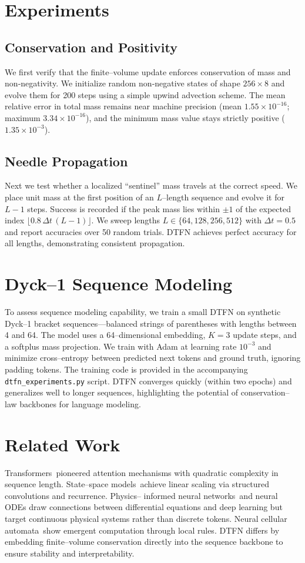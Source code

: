 \documentclass[10pt]{article}
\begin{document}
\section{Experiments}
\subsection{Conservation and Positivity}
We first verify that the finite–volume update enforces conservation of mass
and non‑negativity. We initialize random non‑negative states of shape
$256\times8$ and evolve them for 200 steps using a simple upwind advection
scheme. The mean relative error in total mass remains near machine precision
(mean $1.55\times 10^{-16}$; maximum $3.34\times 10^{-16}$), and the minimum
mass value stays strictly positive ($1.35\times 10^{-3}$).

\subsection{Needle Propagation}
Next we test whether a localized ``sentinel'' mass travels at the correct
speed. We place unit mass at the first position of an $L$--length sequence and
evolve it for $L-1$ steps. Success is recorded if the peak mass lies within
$\pm1$ of the expected index $\lfloor 0.8\,\Delta t\,(L-1)\rfloor$. We sweep
lengths $L\in\{64,128,256,512\}$ with $\Delta t=0.5$ and report accuracies
over 50 random trials. DTFN achieves perfect accuracy for all lengths,
demonstrating consistent propagation.

\section{Dyck--1 Sequence Modeling}
To assess sequence modeling capability, we train a small DTFN on synthetic
Dyck--1 bracket sequences—balanced strings of parentheses with lengths between
4 and 64. The model uses a 64–dimensional embedding, $K=3$ update steps, and a
softplus mass projection. We train with Adam at learning rate $10^{-3}$ and
minimize cross–entropy between predicted next tokens and ground truth,
ignoring padding tokens. The training code is provided in the accompanying
\texttt{dtfn\_experiments.py} script. DTFN converges quickly (within two
epochs) and generalizes well to longer sequences, highlighting the potential
of conservation–law backbones for language modeling.

\section{Related Work}
Transformers\,\cite{vaswani2017attention} pioneered attention mechanisms with
quadratic complexity in sequence length. State–space models\,\cite{gu2021combining,gu2022efficiently}
achieve linear scaling via structured convolutions and recurrence. Physics–
informed neural networks\,\cite{raissi2019physics} and neural ODEs draw
connections between differential equations and deep learning but target
continuous physical systems rather than discrete tokens. Neural cellular
automata\,\cite{mordvintsev2020growing} show emergent computation through
local rules. DTFN differs by embedding finite–volume conservation directly
into the sequence backbone to ensure stability and interpretability.
\end{document}

